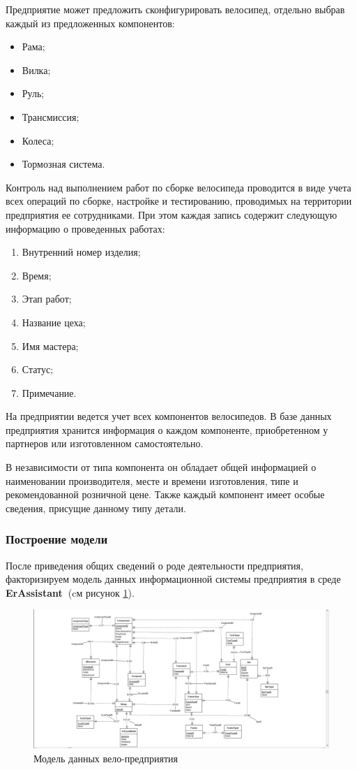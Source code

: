 \documentclass[a4paper,14pt]{extarticle}
\newcommand{\erassistant}{\textbf{ErAssistant~}}
\begin{document}
Предприятие может предложить сконфигурировать велосипед, отдельно выбрав каждый из предложенных компонентов:
\begin{itemize}
	\item Рама;
	\item Вилка;
	\item Руль;
	\item Трансмиссия;
	\item Колеса;
	\item Тормозная система.
\end{itemize}

Контроль над выполнением работ по сборке велосипеда проводится в виде учета всех операций по сборке, настройке и тестированию, проводимых на территории предприятия ее сотрудниками. При этом каждая запись содержит следующую информацию о проведенных работах:
\begin{enumerate}
	\item Внутренний номер изделия;
	\item Время;
	\item Этап работ;
	\item Название цеха;
	\item Имя мастера;
	\item Статус;
	\item Примечание.
\end{enumerate}

\newpage
На предприятии ведется учет всех компонентов велосипедов.
В базе данных предприятия хранится информация о каждом компоненте, приобретенном у партнеров или изготовленном самостоятельно.

 В независимости от типа компонента он обладает общей информацией о наименовании производителя, месте и времени изготовления, типе и рекомендованной розничной цене. 
Также каждый компонент имеет особые сведения, присущие данному типу детали.

\subsubsection*{Построение модели}
После приведения общих сведений о роде деятельности предприятия, факторизируем модель данных информационной системы предприятия в среде \erassistant (cм рисунок \ref{fig:1-cycle}).
\begin{figure}[hpbt]
	\centering
	\includegraphics[width=1\linewidth]{images/1-cycle}
	\caption{Модель данных вело-предприятия}
	\label{fig:1-cycle}
\end{figure}
\end{document}
